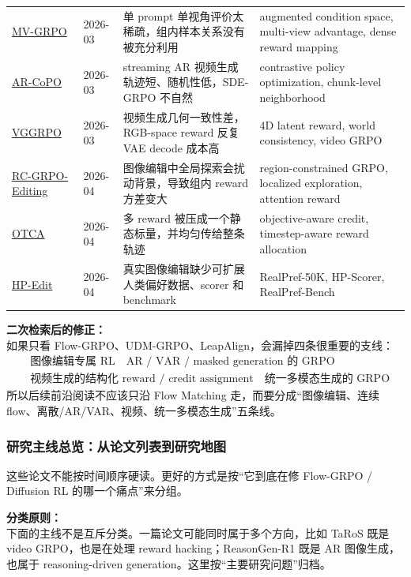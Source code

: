 {\begin{longtable}{p{2.7cm}p{2.1cm}p{4.2cm}p{4.2cm}}
\href{https://arxiv.org/abs/2603.12648}{MV-GRPO}
&
2026-03
&
单 prompt 单视角评价太稀疏，组内样本关系没有被充分利用
&
augmented condition space, multi-view advantage, dense reward mapping
\\
\href{https://arxiv.org/abs/2603.17461}{AR-CoPO}
&
2026-03
&
streaming AR 视频生成轨迹短、随机性低，SDE-GRPO 不自然
&
contrastive policy optimization, chunk-level neighborhood
\\
\href{https://arxiv.org/abs/2603.26599}{VGGRPO}
&
2026-03
&
视频生成几何一致性差，RGB-space reward 反复 VAE decode 成本高
&
4D latent reward, world consistency, video GRPO
\\
\href{https://arxiv.org/abs/2604.09386}{RC-GRPO-Editing}
&
2026-04
&
图像编辑中全局探索会扰动背景，导致组内 reward 方差变大
&
region-constrained GRPO, localized exploration, attention reward
\\
\href{https://arxiv.org/abs/2604.19234}{OTCA}
&
2026-04
&
多 reward 被压成一个静态标量，并均匀传给整条轨迹
&
objective-aware credit, timestep-aware reward allocation
\\
\href{https://arxiv.org/abs/2604.19406}{HP-Edit}
&
2026-04
&
真实图像编辑缺少可扩展人类偏好数据、scorer 和 benchmark
&
RealPref-50K, HP-Scorer, RealPref-Bench
\\
\hline
\end{longtable}
}

\begin{summarybox}
\textbf{二次检索后的修正：}\\
如果只看 Flow-GRPO、UDM-GRPO、LeapAlign，会漏掉四条很重要的支线：
\[
\begin{aligned}
&
\text{图像编辑专属 RL}
\quad
\text{AR / VAR / masked generation 的 GRPO}
\\
&
\text{视频生成的结构化 reward / credit assignment}
\quad
\text{统一多模态生成的 GRPO}
\end{aligned}
\]
所以后续前沿阅读不应该只沿 Flow Matching 走，而要分成“图像编辑、连续 flow、离散/AR/VAR、视频、统一多模态生成”五条线。
\end{summarybox}

\subsubsection{研究主线总览：从论文列表到研究地图}

这些论文不能按时间顺序硬读。更好的方式是按“它到底在修 Flow-GRPO / Diffusion RL 的哪一个痛点”来分组。

\begin{conceptbox}
\textbf{分类原则：}\\
下面的主线不是互斥分类。一篇论文可能同时属于多个方向，比如 TaRoS 既是 video GRPO，也是在处理 reward hacking；ReasonGen-R1 既是 AR 图像生成，也属于 reasoning-driven generation。这里按“主要研究问题”归档。
\end{conceptbox}

